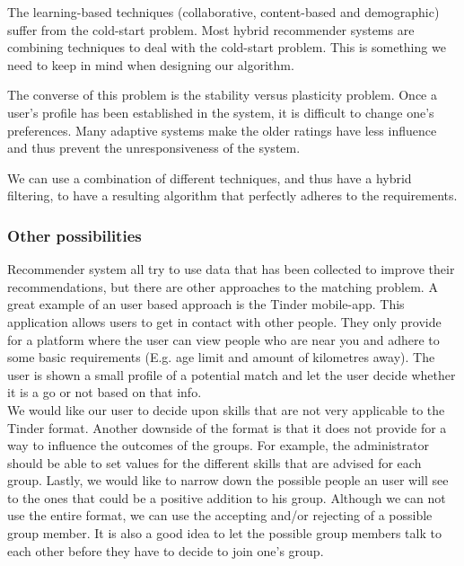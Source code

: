 \documentclass[]{article}
\begin{document}
The learning-based techniques (collaborative, content-based and demographic) suffer from the cold-start problem.
Most hybrid recommender systems are combining techniques to deal with the cold-start problem.
This is something we need to keep in mind when designing our algorithm.

The converse of this problem is the stability versus plasticity problem.
Once a user's profile has been established in the system, it is difficult to change one's preferences.
Many adaptive systems make the older ratings have less influence and thus prevent the unresponsiveness of the system.

We can use a combination of different techniques, and thus have a hybrid filtering, to have a resulting algorithm that perfectly adheres to the requirements.

\subsubsection{Other possibilities}
Recommender system all try to use data that has been collected to improve their recommendations, but there are other approaches to the matching problem.
A great example of an user based approach is the Tinder mobile-app.
This application allows users to get in contact with other people.
They only provide for a platform where the user can view people who are near you and adhere to some basic requirements (E.g. age limit and amount of kilometres away).
The user is shown a small profile of a potential match and let the user decide whether it is a go or not based on that info.\\
We would like our user to decide upon skills that are not very applicable to the Tinder format.
Another downside of the format is that it does not provide for a way to influence the outcomes of the groups.
For example, the administrator should be able to set values for the different skills that are advised for each group.
Lastly, we would like to narrow down the possible people an user will see to the ones that could be a positive addition to his group.
Although we can not use the entire format, we can use the accepting and/or rejecting of a possible group member.
It is also a good idea to let the possible group members talk to each other before they have to decide to join one's group.
\end{document}
